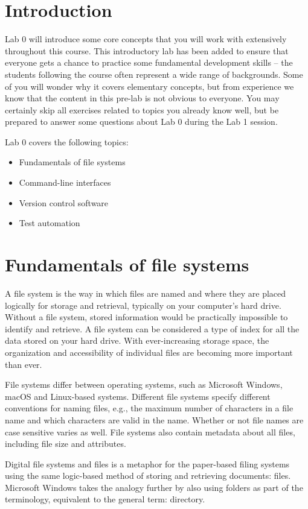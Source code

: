 \documentclass{scrreprt}
\begin{document}
\chapter{Introduction}
Lab 0 will introduce some core concepts that you will work with extensively throughout this course. This introductory lab has been added to ensure that everyone gets a chance to practice some fundamental development skills -- the students following the course often represent a wide range of backgrounds. Some of you will wonder why it covers elementary concepts, but from experience we know that the content in this pre-lab is not obvious to everyone. You may certainly skip all exercises related to topics you already know well, but be prepared to answer some questions about Lab 0 during the Lab 1 session.

Lab 0 covers the following topics:
\begin{itemize}
 \item Fundamentals of file systems
 \item Command-line interfaces
 \item Version control software
 \item Test automation
\end{itemize} 

\chapter{Fundamentals of file systems}
A file system is the way in which files are named and where they are placed logically for storage and retrieval, typically on your computer's hard drive. Without a file system, stored information would be practically impossible  to identify and retrieve. A file system can be considered a type of index for all the data stored on your hard drive. With ever-increasing storage space, the organization and accessibility of individual files are becoming more important than ever.

File systems differ between operating systems, such as Microsoft Windows, macOS and Linux-based systems. Different file systems specify different conventions for naming files, e.g., the maximum number of characters in a file name and which characters are valid in the name. Whether or not file names are case sensitive varies as well. File systems also contain metadata about all files, including file size and attributes. 

Digital file systems and files is a metaphor for the paper-based filing systems using the same logic-based method of storing and retrieving documents: files. Microsoft Windows takes the analogy further by also using folders as part of the terminology, equivalent to the general term: directory.
\end{document}
